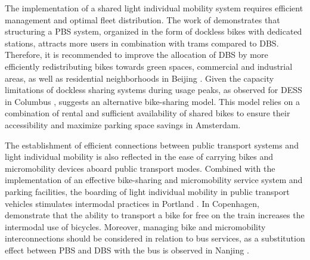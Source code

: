 \begin{refsegment}
The implementation of a shared light individual mobility system requires efficient management and optimal fleet distribution. The work of \textcolor{blue}{\textcite[197]{radzimski_exploring_2021}} demonstrates that structuring a \acrshort{PBS} system, organized in the form of dockless bikes with dedicated stations, attracts more users in combination with trams compared to \acrshort{DBS}. Therefore, it is recommended to improve the allocation of \acrshort{DBS} by more efficiently redistributing bikes towards green spaces, commercial and industrial areas, as well as residential neighborhoods in Beijing \textcolor{blue}{\autocite[12]{liu_temporal_2022}}. Given the capacity limitations of dockless sharing systems during usage peaks, as observed for \acrshort{DESS} in Columbus \textcolor{blue}{\autocite[9]{liu_measuring_2022}}, \textcolor{blue}{\textcite[69, 95]{nat_bicycle_2018}} suggests an alternative bike-sharing model. This model relies on a combination of rental and sufficient availability of shared bikes to ensure their accessibility and maximize parking space savings in Amsterdam.%

The establishment of efficient connections between public transport systems and light individual mobility is also reflected in the ease of carrying bikes and micromobility devices aboard public transport modes. Combined with the implementation of an effective bike-sharing and micromobility service system and parking facilities, the boarding of light individual mobility in public transport vehicles stimulates intermodal practices in Portland \textcolor{blue}{\autocite[93]{singleton_exploring_2014}}. In Copenhagen, \textcolor{blue}{\textcite[19]{halldorsdottir_home-end_2017}} demonstrate that the ability to transport a bike for free on the train increases the intermodal use of bicycles. Moreover, managing bike and micromobility interconnections should be considered in relation to bus services, as a substitution effect between \acrshort{PBS} and \acrshort{DBS} with the bus is observed in Nanjing \textcolor{blue}{\autocite[12]{chen_what_2022}}.%


\end{refsegment}
